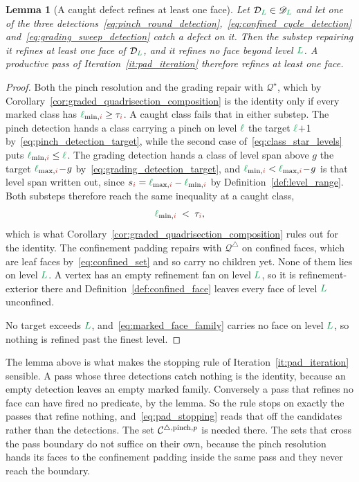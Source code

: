 \documentclass[a4paper, 12pt]{article}
\makeatletter
\newcommand{\quadriF}{\mathcal{Q}^{\triangle}}                   %
\newcommand{\quadriV}{\mathcal{Q}^{\star}}                       %
\DeclareRobustCommand{\candF}[1][]{\mathcal{C}^{\triangle\ifx\@empty#1\@empty\else,#1\fi}}
\newcommand{\quadriVup}[1]{\quadriV_{\rightarrow #1}}            %
\newcommand{\lminIdx}[1]{\l_{\min,#1}}
\newcommand{\lmaxIdx}[1]{\l_{\max,#1}}
\newcommand{\levelSpan}[1]{s_{#1}}
\newcommand{\targetlevel}{\tau}                                 %
\newcommand{\green}{\color{ForestGreen}}
\newcommand{\brickred}{\color{BrickRed}}
\newcommand{\coarseIdxone}{{\brickred i}}
\renewcommand{\l}{{\green\ell}}
\renewcommand{\L}{{\green L}}
\newtheorem{lemma}[theorem]{Lemma}
\theoremstyle{definition}
\theoremstyle{plain}
\numberwithin{equation}{section}
\newcommand{\tobecut}[1]{{\color{red} #1}}     %
\DeclareRobustCommand{\domseq}[1][]{\mathcal{D}\ifx\@empty#1\@empty\else_{#1}\fi}
\newcommand{\alldomseqs}{\mathscr{D}}
\makeatother
\begin{document}
\begin{lemma}[A caught defect refines at least one face]
    \label{lemma:pad_productive}
    Let $\domseq[\L] \in \alldomseqs_\L$ and let one of the three detections~\eqref{eq:pinch_round_detection},~\eqref{eq:confined_cycle_detection} and~\eqref{eq:grading_sweep_detection} catch a defect on it. Then the substep repairing it refines at least one face of $\domseq[\L]$, and it refines no face beyond level $\L$. A productive pass of Iteration~\ref{it:pad_iteration} therefore refines at least one face.
\end{lemma}
\begin{proof}
    Both the pinch resolution and the grading repair with $\quadriV$, which by Corollary~\ref{cor:graded_quadrisection_composition} is the identity only if every marked class has $\lminIdx{\coarseIdxone} \geq \targetlevel_\coarseIdxone$. A caught class fails that in either substep. The pinch detection hands a class carrying a pinch on level $\l$ the target $\l \! + \! 1$ by~\eqref{eq:pinch_detection_target}, while the second case of~\eqref{eq:class_star_levels} puts $\lminIdx{\coarseIdxone} \leq \l$. The grading detection hands a class of level span above $g$ the target $\lmaxIdx{\coarseIdxone} \! - \! g$ by~\eqref{eq:grading_detection_target}, and $\lminIdx{\coarseIdxone} < \lmaxIdx{\coarseIdxone} \! - \! g$ is that level span written out, since $\levelSpan{\coarseIdxone} = \lmaxIdx{\coarseIdxone} - \lminIdx{\coarseIdxone}$ by Definition~\ref{def:level_range}. Both substeps therefore reach the same inequality at a caught class,
    \begin{equation*}
        \lminIdx{\coarseIdxone} \; < \; \targetlevel_\coarseIdxone ,
    \end{equation*}
    which is what Corollary~\ref{cor:graded_quadrisection_composition} rules out for the identity. The confinement padding repairs with $\quadriF$ on confined faces, which are leaf faces by~\eqref{eq:confined_set} and so carry no children yet. None of them lies on level $\L$. A vertex has an empty refinement fan on level $\L$, so it is refinement-exterior there and Definition~\ref{def:confined_face} leaves every face of level $\L$ unconfined.

    No target exceeds $\L$, and~\eqref{eq:marked_face_family} carries no face on level $\L$, so nothing is refined past the finest level.
\end{proof}

The lemma above is what makes the stopping rule of Iteration~\ref{it:pad_iteration} sensible. A pass whose three detections catch nothing is the identity, because an empty detection leaves an empty marked family. Conversely a pass that refines no face can have fired no predicate, by the lemma. So the rule stops on exactly the passes that refine nothing, and~\eqref{eq:pad_stopping} reads that off the candidates rather than the detections.
\tobecut{The set $\candF[\mathrm{pinch},p]$ is needed there. The sets that cross the pass boundary do not suffice on their own, because the pinch resolution hands its faces to the confinement padding inside the same pass and they never reach the boundary.}
\end{document}
